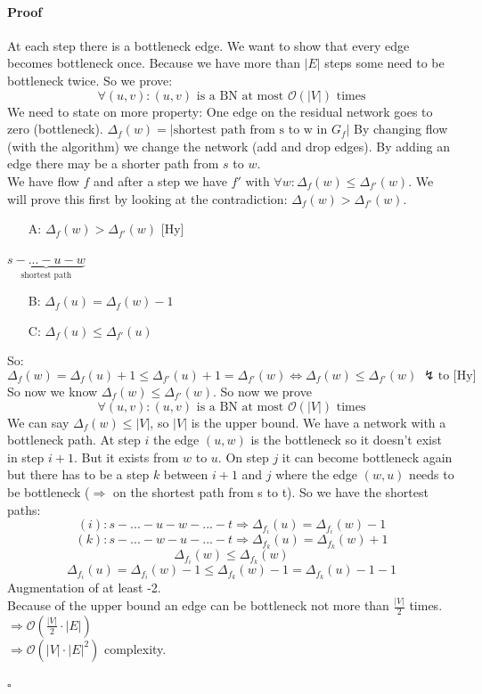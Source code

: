 \paragraph{Proof} At each step there is a bottleneck edge. We want to show that every edge becomes bottleneck once. Because we have more than $|E|$ steps some need to be bottleneck twice. So we prove: \\
$$\forall (u,v): (u,v) \text{ is a BN at most }\mathcal{O}(|V|)\text{ times}$$
We need to state on more property: One edge on the residual network goes to zero (bottleneck). $\Delta_f(w) = |\text{shortest path from s to w in }G_f|$ By changing flow (with the algorithm) we change the network (add and drop edges). By adding an edge there may be a shorter path from $s$ to $w$. \\
We have flow $f$ and after a step we have $f'$ with $\forall w: \Delta_f(w) \leq \Delta_{f'}(w)$. We will prove this first by looking at the contradiction: $\Delta_f(w) > \Delta_{f'}(w)$. 
\begin{itemize}
\item[A:] $\Delta_f(w) > \Delta_{f'}(w) $ [Hy] 
\end{itemize}
$\underbrace{s-...-u-w}_{\text{shortest path}}$ 
\begin{itemize}
\item[B:] $\Delta_f(u) = \Delta_f(w)-1$ 
\item[C:] $\Delta_f(u) \leq \Delta_{f'}(u)$
\end{itemize}
So:
$$\Delta_f(w) = \Delta_f(u)+1 \leq \Delta_{f'}(u)+1 = \Delta_{f'}(w) \Leftrightarrow \Delta_f(w) \leq \Delta_{f'}(w) \; \lightning \text{to [Hy]}$$
So now we know $\Delta_f(w) \leq \Delta_{f'}(w)$. So now we prove 
$$\forall (u,v): (u,v) \text{ is a BN at most }\mathcal{O}(|V|)\text{ times}$$
We can say $\Delta_f(w) \leq |V|$, so $|V|$ is the upper bound.  We have a network with a bottleneck path. At step $i$ the edge $(u,w)$ is the bottleneck so it doesn't exist in step $i+1$. But it exists from $w$ to $u$. On step $j$ it can become bottleneck again but there has to be a step $k$ between $i+1$ and $j$ where the edge $(w,u)$ needs to be bottleneck ($\Rightarrow$ on the shortest path from s to t). So we have the shortest paths: 
$$(i): s-...-u-w-...-t \Rightarrow \Delta_{f_i}(u) = \Delta_{f_i}(w)-1 $$ 
$$(k): s-...-w-u-...-t \Rightarrow \Delta_{f_k}(u) = \Delta_{f_k}(w)+1 $$ 
$$\Delta_{f_i}(w) \leq \Delta_{f_k}(w)$$
$$\Delta_{f_i}(u) = \Delta_{f_i}(w)-1 \leq \Delta_{f_k}(w)-1 = \Delta _{f_k}(u)-1-1$$
Augmentation of at least -2. \\
Because of the upper bound an edge can be bottleneck not more than $\frac{|V|}{2}$ times. $\Rightarrow \mathcal{O}(\frac{|V|}{2} \cdot |E|)$ \\
$\Rightarrow \mathcal{O}(|V| \cdot |E|^2)$ complexity.
\begin{flushright}
	$\square$
\end{flushright}

